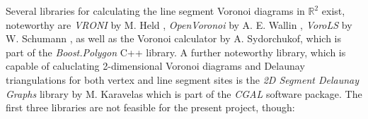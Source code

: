 Several libraries for calculating the line segment Voronoi diagrams in $\mathbb{R}^2$ exist, noteworthy 
are \textit{VRONI} by M. Held \cite{Held2001}, \textit{OpenVoronoi} by A. E. Wallin \cite{web_openvoronoi}, \textit{VoroLS} 
by W. Schumann \cite{DiplomaSchumann}, as well as the Voronoi calculator \cite{web_boost_polygon_voronoi} 
by A. Sydorchukof, which is part of the \textit{Boost.Polygon}  \cite{web_boost_polygon, Simonson2009} 
C++ library.
A further noteworthy library, which is capable of caluclating 2-dimensional Voronoi diagrams and Delaunay triangulations
for both vertex and line segment sites is the \textit{2D Segment Delaunay Graphs} library by M. Karavelas \cite{web_2dsegdel, Karavelas2004, Karavelas2006} 
which is part of the \textit{CGAL} \cite{web_cgal} software package.
The first three libraries are not feasible for the present project, though: 
